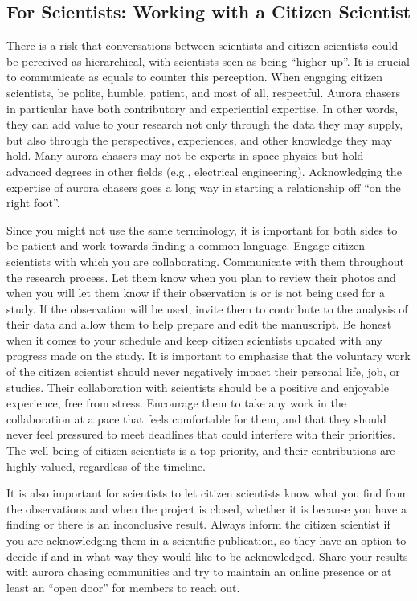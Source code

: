 \documentclass{article}
\newcommand{\contributed}[1]{%
    \par\noindent
    \begingroup
    \setlength{\leftskip}{1em}%
    \itshape
    Contributors: #1
    \par
    \endgroup
    \vspace{0.5em}
}
\begin{document}
\subsection{For Scientists: Working with a Citizen Scientist} 
There is a risk that conversations between scientists and citizen scientists could be perceived as hierarchical, with scientists seen as being ``higher up''. It is crucial to communicate as equals to counter this perception. When engaging citizen scientists, be polite, humble, patient, and most of all, respectful. Aurora chasers in particular have both contributory and experiential expertise. In other words, they can add value to your research not only through the data they may supply, but also through the perspectives, experiences, and other knowledge they may hold. Many aurora chasers may not be experts in space physics but hold advanced degrees in other fields (e.g., electrical engineering). Acknowledging the expertise of aurora chasers goes a long way in starting a relationship off  ``on the right foot''.

Since you might not use the same terminology, it is important for both sides to be patient and work towards finding a common language. Engage citizen scientists with which you are collaborating. Communicate with them throughout the research process. Let them know when you plan to review their photos and when you will let them know if their observation is or is not being used for a study. If the observation will be used, invite them to contribute to the analysis of their data and allow them to help prepare and edit the manuscript. Be honest when it comes to your schedule and keep citizen scientists updated with any progress made on the study. It is important to emphasise that the voluntary work of the citizen scientist should never negatively impact their personal life, job, or studies. Their collaboration with scientists should be a positive and enjoyable experience, free from stress. Encourage them to take any work in the collaboration at a pace that feels comfortable for them, and that they should never feel pressured to meet deadlines that could interfere with their priorities. The well-being of citizen scientists is a top priority, and their contributions are highly valued, regardless of the timeline.

It is also important for scientists to let citizen scientists know what you find from the observations and when the project is closed, whether it is because you have a finding or there is an inconclusive result. Always inform the citizen scientist if you are acknowledging them in a scientific publication, so they have an option to decide if and in what way they would like to be acknowledged. Share your results with aurora chasing communities and try to maintain an online presence or at least an ``open door'' for members to reach out.
\end{document}
